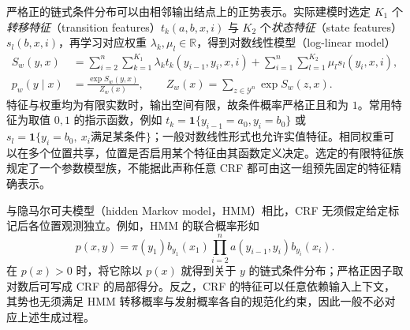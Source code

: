 严格正的链式条件分布可以由相邻输出结点上的正势表示。实际建模时选定 $K_1$ 个\emph{转移特征}（transition features）$t_k(a,b,x,i)$ 与 $K_2$ 个\emph{状态特征}（state features）$s_l(b,x,i)$，再学习对应权重 $\lambda_k,\mu_l\in\mathbb R$，得到对数线性模型（log-linear model）
\begin{align}
\label{eq:lihang-crf-feature-score}
  S_w(y,x)
  &=\sum_{i=2}^{n}\sum_{k=1}^{K_1}\lambda_k t_k(y_{i-1},y_i,x,i)
    +\sum_{i=1}^{n}\sum_{l=1}^{K_2}\mu_l s_l(y_i,x,i),\\
\label{eq:lihang-crf-feature-model}
  p_w(y\mid x)&=\frac{\exp S_w(y,x)}{Z_w(x)},\qquad
  Z_w(x)=\sum_{z\in\mathcal Y^n}\exp S_w(z,x).
\end{align}
特征与权重均为有限实数时，输出空间有限，故条件概率严格正且和为 $1$。常用特征为取值 $0,1$ 的指示函数，例如 $t_k=\mathbf1\{y_{i-1}=a_0,y_i=b_0\}$ 或 $s_l=\mathbf1\{y_i=b_0,\ x_i\text{满足某条件}\}$；一般对数线性形式也允许实值特征。相同权重可以在多个位置共享，位置是否启用某个特征由其函数定义决定。选定的有限特征族规定了一个参数模型族，不能据此声称任意 CRF 都可由这一组预先固定的特征精确表示。

与隐马尔可夫模型（hidden Markov model，HMM）相比，CRF 无须假定给定标记后各位置观测独立。例如，HMM 的联合概率形如
\[
  p(x,y)=\pi(y_1)b_{y_1}(x_1)
         \prod_{i=2}^n a(y_{i-1},y_i)b_{y_i}(x_i).
\]
在 $p(x)>0$ 时，将它除以 $p(x)$ 就得到关于 $y$ 的链式条件分布；严格正因子取对数后可写成 CRF 的局部得分。反之，CRF 的特征可以任意依赖输入上下文，其势也无须满足 HMM 转移概率与发射概率各自的规范化约束，因此一般不必对应上述生成过程。

